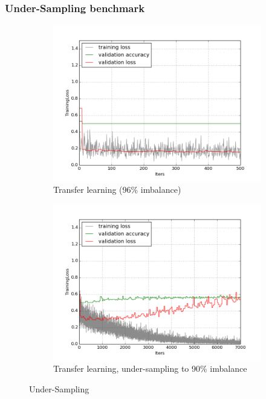 \documentclass[a4paper,11pt]{article}
\begin{document}
\subsubsection{Under-Sampling benchmark}
\begin{figure}
    \centering
    \begin{minipage}[b]{\textwidth}
      \begin{subfigure}{.5\textwidth} 
        \centering
        \includegraphics[scale=0.4]{images/plot_soil_contam_noneC.png}
        \caption{Transfer learning (96\% imbalance)}\label{fig:2a}
      \end{subfigure}%
      \begin{subfigure}{.5\textwidth} 
        \centering
        \includegraphics[scale=0.4]{images/plot_soil_contam_us90_none.png}
        \caption{Transfer learning, under-sampling to 90\% imbalance}\label{fig:2b}
      \end{subfigure} \par \vspace*{20pt} %
      \caption{Under-Sampling}\label{fig:2}
    \end{minipage}%
    \label{f56}
\end{figure}
\end{document}
